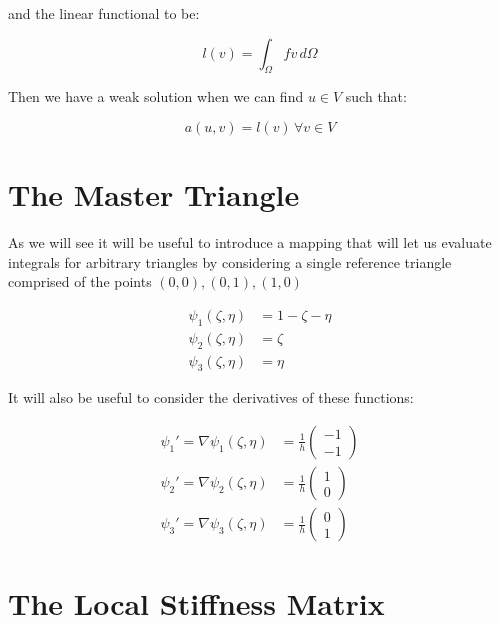 and the linear functional to be:

\[
    l(v) = \int_{\Omega}fv\,d\Omega
\]

Then we have a weak solution when we can find $u \in V$ such that:

\begin{equation}\label{eq:weak_formulation}
    a(u,v) = l(v)\, \forall v \in V
\end{equation}

\section{The Master Triangle}

As we will see it will be useful to introduce a mapping that will let us
evaluate integrals for arbitrary triangles by considering a single reference
triangle comprised of the points $(0,0), (0,1), (1,0)$


\begin{align}\label{eq:master_basis_functions}
    \psi_1(\zeta, \eta) &= 1 - \zeta - \eta \\
    \psi_2(\zeta, \eta) &= \zeta \\
    \psi_3(\zeta, \eta) &= \eta
\end{align}

It will also be useful to consider the derivatives of these functions:

\begin{align}\label{eq:master_basis_functions_derivative}
    \psi_1' = \nabla\psi_1(\zeta, \eta) &=
        \frac{1}{h}\left(\begin{array}{c}-1 \\ -1\end{array}\right) \\
    \psi_2' = \nabla\psi_2(\zeta, \eta) &=
        \frac{1}{h}\left(\begin{array}{c}1 \\ 0\end{array}\right) \\
    \psi_3' = \nabla\psi_3(\zeta, \eta) &=
        \frac{1}{h}\left(\begin{array}{c}0 \\ 1\end{array}\right)
\end{align}

\section{The Local Stiffness Matrix}

